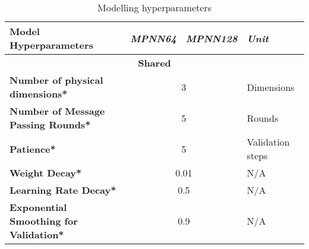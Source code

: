 
%



\begin{table}[H]
    \centering
    \caption{Modelling hyperparameters}
    \label{tab:hyperparameters}
    \begin{tabular}{|lcll|}
        \hline
        \multicolumn{1}{|l|}{\textbf{Model Hyperparameters}}                 & \multicolumn{1}{l|}{\textit{\textbf{MPNN64}}} & \multicolumn{1}{l|}{\textit{\textbf{MPNN128}}} & \textit{\textbf{Unit}} \\ \hline
        \multicolumn{4}{|c|}{\textbf{Shared}}                                                                                                                                                          \\ \hline
        \multicolumn{1}{|l|}{\textbf{Number of physical dimensions*}}        & \multicolumn{2}{c|}{3}                        & Dimensions                                                              \\ \hline
        \multicolumn{1}{|l|}{\textbf{Number of Message Passing Rounds*}}     & \multicolumn{2}{c|}{5}                        & Rounds                                                                  \\ \hline
        \multicolumn{1}{|l|}{\textbf{Patience*}}                             & \multicolumn{2}{c|}{5}                        & Validation steps                                                        \\ \hline
        \multicolumn{1}{|l|}{\textbf{Weight Decay*}}                         & \multicolumn{2}{c|}{0.01}                     & N/A                                                                     \\ \hline
        \multicolumn{1}{|l|}{\textbf{Learning Rate Decay*}}                  & \multicolumn{2}{c|}{0.5}                      & N/A                                                                     \\ \hline
        \multicolumn{1}{|l|}{\textbf{Exponential Smoothing for Validation*}} & \multicolumn{2}{c|}{0.9}                      & N/A                                                                     \\ \hline

\end{tabular}
\end{table}
